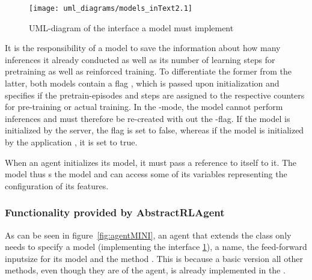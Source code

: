 \begin{figure}[h]
	\centering 
	\texttt{[image: uml\_diagrams/models\_inText2.1]}
	\caption{UML-diagram of the interface a model must implement}
	\label{fig:modelsInt}
\end{figure}

It is the responsibility of a model to save the information about how many inferences it already conducted as well as its number of learning steps for pretraining as well as reinforced training. To differentiate the former from the latter, both models contain a flag , which is passed upon initialization and specifies if the pretrain-episodes and steps are assigned to the respective counters for pre-training or actual training. In the -mode, the model cannot perform inferences and must therefore be re-created with out the -flag. If the model is initialized by the server, the flag is set to false, whereas if the model is initialized by the application , it is set to true.

When an agent initializes its model, it must pass a reference to itself to it. The model thus s the model and can access some of its variables representing the configuration of its features.


\subsubsection{Functionality provided by AbstractRLAgent}

As can be seen in figure~\ref{fig:agentMINI}, an agent that extends the class  only needs to specify a model (implementing the interface \ref{fig:modelsInt}), a name, the feed-forward inputsize for its model and the method . This is because a basic version all other methods, even though they are  of the agent, is already implemented in the . 

